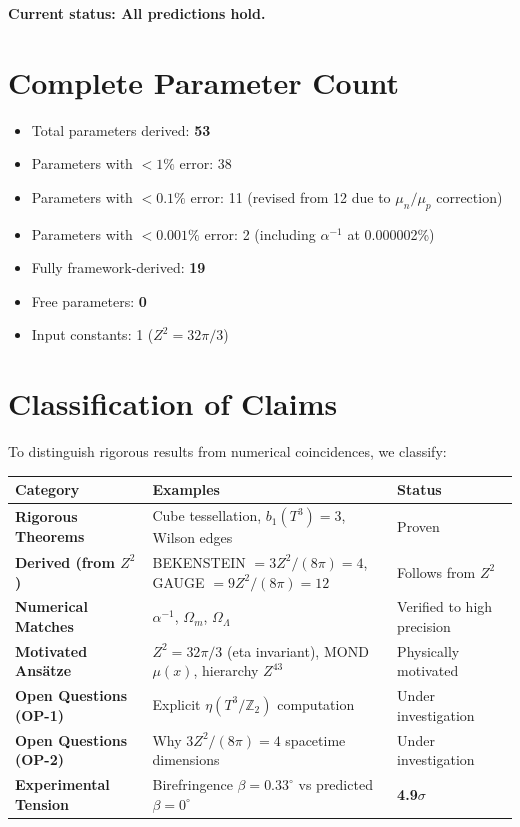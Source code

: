 \documentclass[11pt,a4paper]{article}
\theoremstyle{plain}
\theoremstyle{definition}
\theoremstyle{remark}
\begin{document}
\textbf{Current status: All predictions hold.}

\section{Complete Parameter Count}

\begin{itemize}
  \item Total parameters derived: \textbf{53}
  \item Parameters with $<1\%$ error: 38
  \item Parameters with $<0.1\%$ error: 11 (revised from 12 due to $\mu_n/\mu_p$ correction)
  \item Parameters with $<0.001\%$ error: 2 (including $\alpha^{-1}$ at 0.000002\%)
  \item Fully framework-derived: \textbf{19}
  \item Free parameters: \textbf{0}
  \item Input constants: 1 ($Z^2 = 32\pi/3$)
\end{itemize}

\section{Classification of Claims}

To distinguish rigorous results from numerical coincidences, we classify:

\begin{table}[h!]
\centering
\begin{tabular}{lll}
\toprule
\textbf{Category} & \textbf{Examples} & \textbf{Status} \\
\midrule
\textbf{Rigorous Theorems} & Cube tessellation, $b_1(T^3)=3$, Wilson edges & Proven \\
\textbf{Derived (from $Z^2$)} & BEKENSTEIN $= 3Z^2/(8\pi) = 4$, GAUGE $= 9Z^2/(8\pi) = 12$ & Follows from $Z^2$ \\
\textbf{Numerical Matches} & $\alpha^{-1}$, $\Omega_m$, $\Omega_\Lambda$ & Verified to high precision \\
\textbf{Motivated Ans\"atze} & $Z^2 = 32\pi/3$ (eta invariant), MOND $\mu(x)$, hierarchy $Z^{43}$ & Physically motivated \\
\textbf{Open Questions (OP-1)} & Explicit $\eta(T^3/\mathbb{Z}_2)$ computation & Under investigation \\
\textbf{Open Questions (OP-2)} & Why $3Z^2/(8\pi) = 4$ spacetime dimensions & Under investigation \\
\textbf{Experimental Tension} & Birefringence $\beta = 0.33^\circ$ vs predicted $\beta = 0^\circ$ & \textbf{4.9$\sigma$} \\
\bottomrule
\end{tabular}
\end{table}
\end{document}
